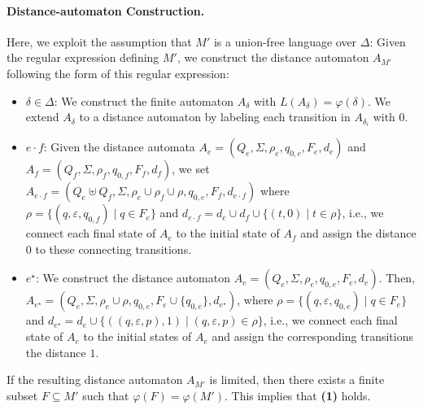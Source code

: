 \documentclass[envcountsame]{llncs}
\begin{document}
\paragraph{Distance-automaton Construction.}
Here, we exploit the assumption that $M'$ is a union-free language
over $\Delta$:
Given the regular expression defining $M'$, we construct the distance
automaton $A_{M'}$ following the form of this regular expression:
\begin{itemize}
\item $\delta\in\Delta$: We construct the finite automaton $A_{\delta}$
  with $L(A_{\delta}) = \varphi(\delta)$.  We extend $A_{\delta}$ to a
  distance automaton by labeling each transition in $A_{\delta_i}$
  with $0$.
\item $e \cdot f$: Given the distance automata $A_{e} = (Q_{e},
  \Sigma, \rho_{e}, q_{0,e}, F_{e}, d_{e})$ and $A_{f} = (Q_{f},
  \Sigma, \rho_{f}, q_{0,f}, F_{f}, d_{f})$, we set $A_{e \cdot f} =
  (Q_{e} \uplus Q_{f}, \Sigma, \rho_{e} \cup \rho_{f} \cup \rho, q_{0,
    e}, F_{f}, d_{e \cdot f})$ where $\rho = \{ (q, \varepsilon, q_{0,
    f}) \mid q \in F_{e} \}$ and $d_{e \cdot f} = d_{e} \cup d_{f}
  \cup \{ (t, 0) \mid t \in \rho \}$, i.e., we connect each final
  state of $A_{e}$ to the initial state of $A_{f}$ and assign the
  distance $0$ to these connecting transitions.
\item $e^\star$: We construct the distance automaton $A_{e} =
  (Q_{e}, \Sigma, \rho_{e}, q_{0, e}, F_{e}, d_{e})$.  Then,
  $A_{e^\star} = (Q_{e}, \Sigma, \rho_{e} \cup \rho, q_{0, e},
  F_{e} \cup \{ q_{0, e} \}, d_{e^\star})$, where $\rho = \{ (q,
  \varepsilon, q_{0, e}) \mid q \in F_{e} \}$ and $d_{e^\star} =
  d_{e} \cup \{ ((q, \varepsilon, p), 1) \mid (q, \varepsilon, p) \in
  \rho \}$, i.e., we connect each final state of $A_{e}$ to the
  initial states of $A_{e}$ and assign the corresponding transitions
  the distance $1$.
\end{itemize}
If the resulting distance automaton $A_{M'}$ is limited, then there
exists a finite subset $F \subseteq M'$ such that $\varphi(F) =
\varphi(M')$.
This implies that {\bfseries(1)} holds.
\end{document}
